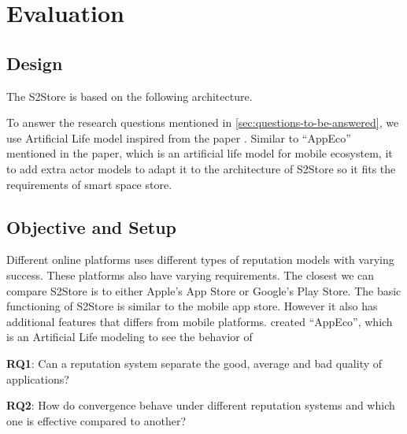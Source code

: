 \chapter{Evaluation}


%
%
%

\section{Design}

The S2Store is based on the following architecture.

To answer the research questions mentioned in \ref{sec:questions-to-be-answered}, we use Artificial Life model inspired from the paper \cite{lim2012successful}. Similar to ``AppEco'' mentioned in the paper, which is an artificial life model for mobile ecosystem,  it to add extra actor models to adapt it to the architecture of S2Store so it fits the requirements of smart space store.

\section{Objective and Setup}

Different online platforms uses different types of reputation models with varying success. These platforms also have varying requirements. The closest we can compare S2Store is to either Apple's App Store or Google's Play Store. The basic functioning of S2Store is similar to the mobile app store. However it also has additional features that differs from mobile platforms. \cite{lim2012successful} created ``AppEco'', which is an Artificial Life modeling to see the behavior of

\textbf{RQ1}: Can a reputation system separate the good, average and bad quality of applications?

\textbf{RQ2}: How do convergence behave under different reputation systems and which one is effective compared to another?

